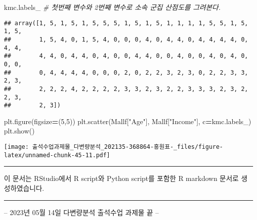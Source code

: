 \documentclass[
]{article}
\newenvironment{Shaded}{\begin{snugshade}}{\end{snugshade}}
\newcommand{\CommentTok}[1]{\textcolor[rgb]{0.56,0.35,0.01}{\textit{#1}}}
\newcommand{\DecValTok}[1]{\textcolor[rgb]{0.00,0.00,0.81}{#1}}
\newcommand{\NormalTok}[1]{#1}
\newcommand{\OperatorTok}[1]{\textcolor[rgb]{0.81,0.36,0.00}{\textbf{#1}}}
\newcommand{\StringTok}[1]{\textcolor[rgb]{0.31,0.60,0.02}{#1}}
\begin{document}
\begin{Shaded}
\begin{Highlighting}[]
\NormalTok{kmc.labels\_}
\CommentTok{\# 첫번째 변수와 2번째 변수로 소속 군집 산점도를 그려본다.}
\end{Highlighting}
\end{Shaded}

\begin{verbatim}
## array([1, 5, 1, 5, 1, 5, 5, 5, 1, 5, 1, 5, 1, 1, 1, 1, 5, 5, 1, 5, 1, 5,
##        1, 5, 4, 0, 1, 5, 4, 0, 0, 0, 4, 0, 4, 4, 0, 4, 4, 4, 4, 0, 4, 4,
##        4, 4, 0, 4, 4, 0, 4, 0, 0, 4, 4, 0, 0, 4, 0, 0, 4, 0, 4, 0, 0, 0,
##        0, 4, 4, 4, 4, 0, 0, 0, 2, 0, 2, 2, 3, 2, 3, 0, 2, 2, 3, 3, 2, 3,
##        2, 2, 2, 4, 2, 2, 2, 2, 3, 3, 2, 3, 2, 2, 3, 3, 3, 2, 3, 2, 2, 3,
##        2, 3])
\end{verbatim}

\begin{Shaded}
\begin{Highlighting}[]
\NormalTok{plt.figure(figsize}\OperatorTok{=}\NormalTok{(}\DecValTok{5}\NormalTok{,}\DecValTok{5}\NormalTok{))}
\NormalTok{plt.scatter(Mallf[}\StringTok{"Age"}\NormalTok{], Mallf[}\StringTok{"Income"}\NormalTok{], c}\OperatorTok{=}\NormalTok{kmc.labels\_)}
\NormalTok{plt.show()}
\end{Highlighting}
\end{Shaded}

\texttt{[image: 출석수업과제물\_다변량분석\_202135-368864-홍원표-\_files/figure-latex/unnamed-chunk-45-11.pdf]}

\begin{center}\rule{0.5\linewidth}{0.5pt}\end{center}

이 문서는 RStudio에서 R script와 Python script를 포함한 R markdown
문서로 생성하였습니다.

\begin{center}\rule{0.5\linewidth}{0.5pt}\end{center}

-- 2023년 05월 14일 다변량분석 출석수업 과제물 끝 --
\end{document}
